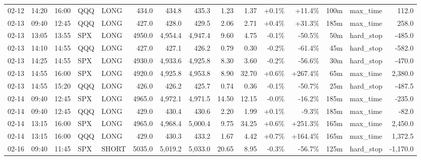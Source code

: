 \documentclass[11pt,a4paper,twoside]{article}
\begin{document}
\begin{landscape}
\begin{center}
\begin{longtable}{>{\color{txtmain}}l l l l l r r r r r r r r >{\color{txtmain}}l r}
02-12 & 14:20 & 16:00 & QQQ & LONG & 434.0 & 434.8 & 435.3 & 1.23 & 1.37 & \textcolor{wingreen}{+0.1\%} & \textcolor{wingreen}{+11.4\%} & 100m & max\_time & \textcolor{wingreen}{112.0} \\
02-13 & 09:40 & 12:45 & QQQ & LONG & 427.0 & 428.0 & 429.5 & 2.06 & 2.71 & \textcolor{wingreen}{+0.4\%} & \textcolor{wingreen}{+31.3\%} & 185m & max\_time & \textcolor{wingreen}{258.0} \\
02-13 & 13:05 & 13:55 & SPX & LONG & 4950.0 & 4,954.4 & 4,947.4 & 9.60 & 4.75 & \textcolor{lossred}{-0.1\%} & \textcolor{lossred}{-50.5\%} & 50m & hard\_stop & \textcolor{lossred}{-485.0} \\
02-13 & 14:10 & 14:55 & QQQ & LONG & 427.0 & 427.1 & 426.2 & 0.79 & 0.30 & \textcolor{lossred}{-0.2\%} & \textcolor{lossred}{-61.4\%} & 45m & hard\_stop & \textcolor{lossred}{-582.0} \\
02-13 & 14:25 & 14:55 & SPX & LONG & 4930.0 & 4,933.6 & 4,925.8 & 8.30 & 3.60 & \textcolor{lossred}{-0.2\%} & \textcolor{lossred}{-56.6\%} & 30m & hard\_stop & \textcolor{lossred}{-470.0} \\
02-13 & 14:55 & 16:00 & SPX & LONG & 4920.0 & 4,925.8 & 4,953.8 & 8.90 & 32.70 & \textcolor{wingreen}{+0.6\%} & \textcolor{wingreen}{+267.4\%} & 65m & max\_time & \textcolor{wingreen}{2,380.0} \\
02-13 & 14:55 & 15:20 & QQQ & LONG & 426.0 & 426.2 & 425.7 & 0.74 & 0.36 & \textcolor{lossred}{-0.1\%} & \textcolor{lossred}{-50.7\%} & 25m & hard\_stop & \textcolor{lossred}{-487.5} \\
02-14 & 09:40 & 12:45 & SPX & LONG & 4965.0 & 4,972.1 & 4,971.5 & 14.50 & 12.15 & \textcolor{lossred}{-0.0\%} & \textcolor{lossred}{-16.2\%} & 185m & max\_time & \textcolor{lossred}{-235.0} \\
02-14 & 09:40 & 12:45 & QQQ & LONG & 429.0 & 430.4 & 430.6 & 2.20 & 1.99 & \textcolor{wingreen}{+0.1\%} & \textcolor{lossred}{-9.3\%} & 185m & max\_time & \textcolor{lossred}{-82.0} \\
02-14 & 13:15 & 16:00 & SPX & LONG & 4965.0 & 4,968.4 & 5,000.4 & 9.75 & 34.25 & \textcolor{wingreen}{+0.6\%} & \textcolor{wingreen}{+251.3\%} & 165m & max\_time & \textcolor{wingreen}{2,450.0} \\
02-14 & 13:15 & 16:00 & QQQ & LONG & 429.0 & 430.3 & 433.2 & 1.67 & 4.42 & \textcolor{wingreen}{+0.7\%} & \textcolor{wingreen}{+164.4\%} & 165m & max\_time & \textcolor{wingreen}{1,372.5} \\
02-16 & 09:40 & 11:45 & SPX & SHORT & 5035.0 & 5,019.2 & 5,033.0 & 20.65 & 8.95 & \textcolor{lossred}{-0.3\%} & \textcolor{lossred}{-56.7\%} & 125m & hard\_stop & \textcolor{lossred}{-1,170.0} \\

\end{longtable}
\end{center}
\end{landscape}
\end{document}

